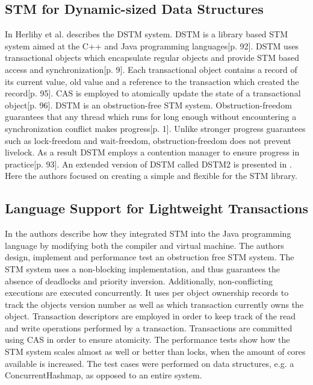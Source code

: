 \subsection{\ac{STM} for Dynamic-sized Data Structures}
In \cite{herlihy2003software} Herlihy et al. describes the \ac{DSTM} system. \ac{DSTM} is a library based \ac{STM} system aimed at the C++ and Java programming languages\cite{herlihy2003software}[p. 92]. \ac{DSTM} uses transactional objects which encapsulate regular objects and provide \ac{STM} based access and synchronization\cite{herlihy2003software}[p. 9]. Each transactional object contains a record of its current value, old value and a reference to the transaction which created the record\cite{herlihy2003software}[p. 95]. \ac{CAS} is employed to atomically update the state of a transactional object\cite{herlihy2003software}[p. 96]. \ac{DSTM} is an obstruction-free\cite{herlihy2003obstruction} \ac{STM} system. Obstruction-freedom guarantees that any thread which runs for long enough without encountering a synchronization conflict makes progress\cite{herlihy2003obstruction}[p. 1]. Unlike stronger progress guarantees such as lock-freedom and wait-freedom, obstruction-freedom does not prevent livelock\cite[p. 47]{harris2010transactional}. As a result \ac{DSTM} employs a contention manager to ensure progress in practice\cite{herlihy2003software}[p. 93]. An extended version of \ac{DSTM} called DSTM2 is presented in \cite{herlihy2006flexible}. Here the authors focused on creating a simple and flexible  for the \ac{STM} library.

\subsection{Language Support for Lightweight Transactions}
In \cite{harris2003language} the authors describe how they integrated \ac{STM} into the Java programming language by modifying both the compiler\cite[p. 4]{harris2003language} and virtual machine\cite[p. 9]{harris2003language}. The authors design, implement and performance test an obstruction free \ac{STM} system. The \ac{STM} system uses a non-blocking implementation, and thus guarantees the absence of deadlocks and priority inversion. Additionally, non-conflicting executions are executed concurrently. It uses per object ownership records to track the objects version number as well as which transaction currently owns the object\cite[p. 6]{harris2003language}. Transaction descriptors are employed in order to keep track of the read and write operations performed by a transaction. Transactions are committed  using \ac{CAS} in order to ensure atomicity\cite[p. 7]{harris2003language}. The performance tests show how the \ac{STM} system scales almost as well or better than locks, when the amount of cores available is increased\cite[p. 12]{harris2003language}. The test cases were performed on data structures, e.g. a ConcurrentHashmap, as opposed to an entire system.


